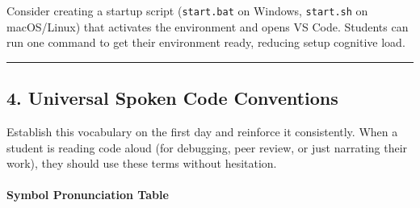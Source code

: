 \documentclass[
  justified,
  openright,
]{tufte-book}
\let\subsubsection\paragraph
\let\paragraph\paragraph
\let\subsubsection\paragraph
\let\paragraph\paragraph
\begin{document}
Consider creating a startup script (\texttt{start.bat} on Windows,
\texttt{start.sh} on macOS/Linux) that activates the environment and
opens VS Code. Students can run one command to get their environment
ready, reducing setup cognitive load.

\begin{center}\rule{0.5\linewidth}{0.5pt}\end{center}

\subsection{4. Universal Spoken Code
Conventions}\label{universal-spoken-code-conventions}

Establish this vocabulary on the first day and reinforce it
consistently. When a student is reading code aloud (for debugging, peer
review, or just narrating their work), they should use these terms
without hesitation.

\subsubsection{Symbol Pronunciation
Table}\label{symbol-pronunciation-table}
\end{document}
